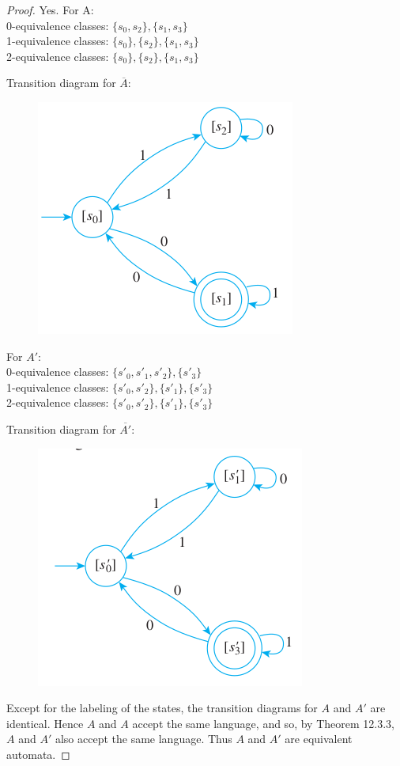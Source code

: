 \documentclass[14pt]{extarticle}
\begin{document}
\begin{proof}
Yes. For A: \\
0-equivalence classes: \(\{s_0, s_2\}, \{s_1, s_3\}\) \\
1-equivalence classes: \(\{s_0\}, \{s_2\}, \{s_1, s_3\}\) \\
2-equivalence classes: \(\{s_0\}, \{s_2\}, \{s_1, s_3\}\)

Transition diagram for \(\overline{A}\):

\begin{figure}[ht!]
\centering
\includegraphics[scale=0.5]{../images/12.3.7.a.png}
\end{figure}

For \(A'\): \\
0-equivalence classes: \(\{s'_0, s'_1, s'_2\}, \{s'_3\}\) \\
1-equivalence classes: \(\{s'_0, s'_2\}, \{s'_1\}, \{s'_3\}\) \\
2-equivalence classes: \(\{s'_0, s'_2\}, \{s'_1\}, \{s'_3\}\)

Transition diagram for \(\overline{A'}\):

\begin{figure}[ht!]
\centering
\includegraphics[scale=0.5]{../images/12.3.7.b.png}
\end{figure}

Except for the labeling of the states, the transition diagrams for \(A\) and \(A'\) are identical. Hence \(A\) and \(A\) 
accept the same language, and so, by Theorem 12.3.3, \(A\) and \(A'\) also accept the same language. Thus \(A\) and \(A'\) 
are equivalent automata.
\end{proof}
\end{document}
